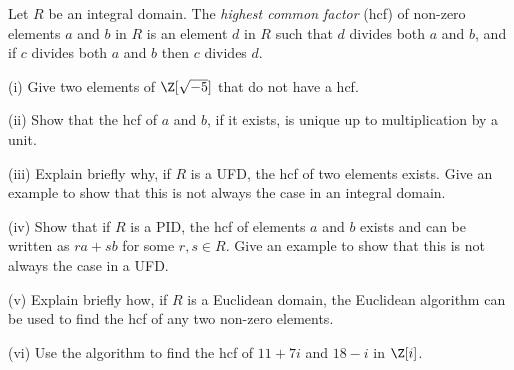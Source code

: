 








\begin{problem}
Let $R$ be an integral domain. The \emph{highest common factor} (hcf) of non-zero elements $a$ and $b$ in $R$ is an element $d$ in $R$ such that $d$ divides both $a$ and $b$, and if $c$ divides both $a$ and $b$ then $c$ divides $d$.
\ben
\item [(i)] Give two elements of $\Z[\sqrt{-5}]$ that do not have a hcf.
\item [(ii)] Show that the hcf of $a$ and $b$, if it exists, is unique up to multiplication by a unit.
\item [(iii)] Explain briefly why, if $R$ is a UFD, the hcf of two elements exists. Give an example to show that this is not always the case in an integral domain.
\item [(iv)] Show that if $R$ is a PID, the hcf of elements $a$ and $b$ exists and can be written as $ra + sb$ for some $r, s \in R$. Give an example to show that this is not always the case in a UFD.
\item [(v)] Explain briefly how, if $R$ is a Euclidean domain, the Euclidean algorithm can be used to find the hcf of any two non-zero elements. 
\item [(vi)]Use the algorithm to find the hcf of $11 + 7i$ and $18 - i$ in $\Z[i]$.
\een
\end{problem}

